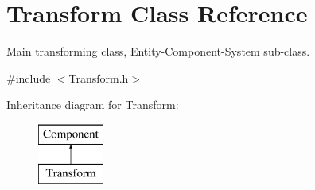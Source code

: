 \hypertarget{class_transform}{}\section{Transform Class Reference}
\label{class_transform}


Main transforming class, Entity-\/\+Component-\/\+System sub-\/class.  




{\ttfamily \#include $<$Transform.\+h$>$}

Inheritance diagram for Transform\+:\begin{figure}[H]
\begin{center}
\leavevmode
\includegraphics[height=2.000000cm]{class_transform}
\end{center}
\end{figure}
